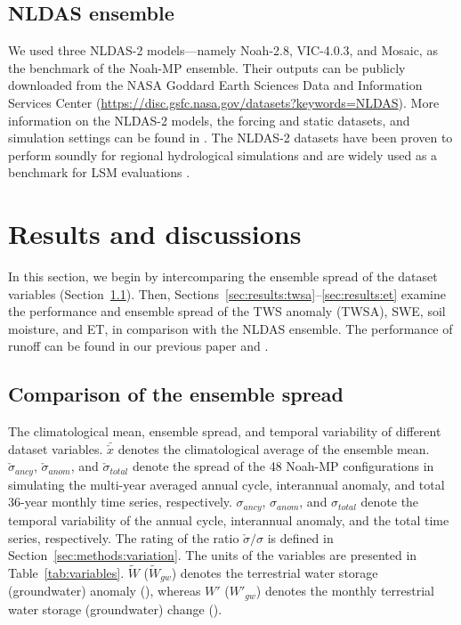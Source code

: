 \documentclass[essd, manuscript]{copernicus}
\let\unit\undefined
\begin{document}
\subsection{NLDAS ensemble}\label{sec:methods:nldas}

We used three NLDAS-2 models---namely Noah-2.8, VIC-4.0.3, and Mosaic, as the benchmark of the Noah-MP ensemble. Their outputs can be publicly downloaded from the NASA Goddard Earth Sciences Data and Information Services Center (\url{https://disc.gsfc.nasa.gov/datasets?keywords=NLDAS}). More information on the NLDAS-2 models, the forcing and static datasets, and simulation settings can be found in \citet{xia2012JGRA, xia2012JGRAa}. The NLDAS-2 datasets have been proven to perform soundly for regional hydrological simulations \citep{xia2012JGRA, xia2012JGRAa, xia2016JGRA, xia2015JHa, xia2015JH} and are widely used as a benchmark for LSM evaluations \citep{cai2014JGRAa, fei2021WRR}.

\section{Results and discussions}\label{sec:results}

In this section, we begin by intercomparing the ensemble spread of the dataset variables (Section~\ref{sec:results:spread}). Then, Sections~\ref{sec:results:twsa}--\ref{sec:results:et} examine the performance and ensemble spread of the TWS anomaly (TWSA), SWE, soil moisture, and ET, in comparison with the NLDAS ensemble. The performance of runoff can be found in our previous paper \citet{fei2021WRR} and \citet{zheng2020JAMES}.

\subsection{Comparison of the ensemble spread}\label{sec:results:spread}

\begin{table}[t]
  \caption{The climatological mean, ensemble spread, and temporal variability of different dataset variables. \(\bar{\check{x}}\) denotes the climatological average of the ensemble mean. \(\check{\sigma}_{ancy}\), \(\check{\sigma}_{anom}\), and \(\check{\sigma}_{total}\) denote the spread of the 48 Noah-MP configurations in simulating the multi-year averaged annual cycle, interannual anomaly, and total 36-year monthly time series, respectively. \(\sigma_{ancy}\), \(\sigma_{anom}\), and \(\sigma_{total}\) denote the temporal variability of the annual cycle, interannual anomaly, and the total time series, respectively. The rating of the ratio \(\check{\sigma}/\sigma\) is defined in Section~\ref{sec:methods:variation}. The units of the variables are presented in Table~\ref{tab:variables}. \(\tilde{W}\) (\(\tilde{W}_{gw}\)) denotes the terrestrial water storage (groundwater) anomaly (\unit{kg.m^{-2}}), whereas \(W'\) (\(W'_{gw}\)) denotes the monthly terrestrial water storage (groundwater) change (\unit{kg.m^{-2}.s^{-1}}).}
  \label{tab:statistics}
  
\end{table}
\end{document}
